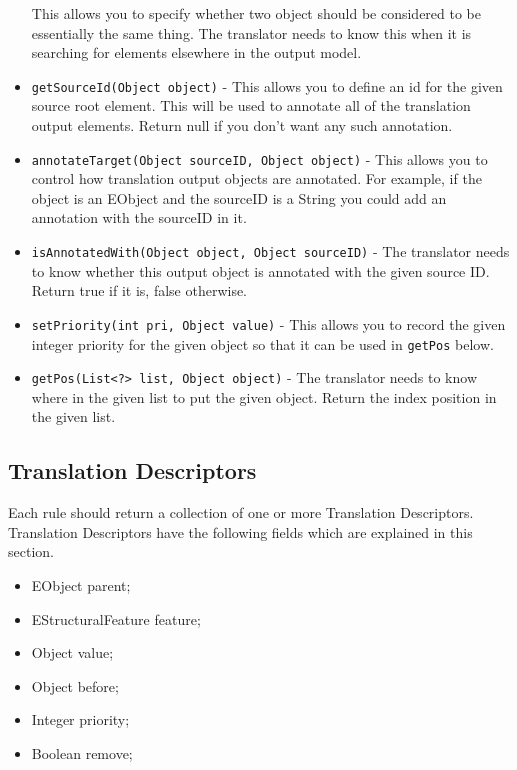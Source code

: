\begin{itemize}
 	This allows you to specify whether two object should be considered to be essentially the same thing.
 	The translator needs to know this when it is searching for elements elsewhere in the output model.
 	\item \texttt{getSourceId(Object object)} -
 	This allows you to define an id for the given source root element.
 	This will be used to annotate all of the translation output elements.
 	Return null if you don't want any such annotation.
 	\item \texttt{annotateTarget(Object sourceID, Object object)} -
 	This allows you to control how translation output objects are annotated.
 	For example, if the object is an EObject and the sourceID is a String you could add an annotation with the sourceID in it. 
 	\item \texttt{isAnnotatedWith(Object object, Object sourceID)} - 
 	The translator needs to know whether this output object is annotated with the given source ID.
 	Return true if it is, false otherwise.
 	\item \texttt{setPriority(int pri, Object value)} -
 	This allows you to record the given integer priority for the given object so that it can be used in \texttt{getPos} below. 
 	\item \texttt{getPos(List<?> list, Object object)} -
 	The translator needs to know where in the given list to put the given object.
 	Return the index position in the given list.
 	
\end{itemize}

\subsection{Translation Descriptors}
\label{sec:descriptors}

Each rule should return a collection of one or more Translation Descriptors. Translation Descriptors have the following fields which are explained in this section.

\begin{itemize}
	\item EObject parent;
	\item EStructuralFeature feature;
	\item Object value;
	\item Object before;
	\item Integer priority;
	\item Boolean remove;
\end{itemize}

